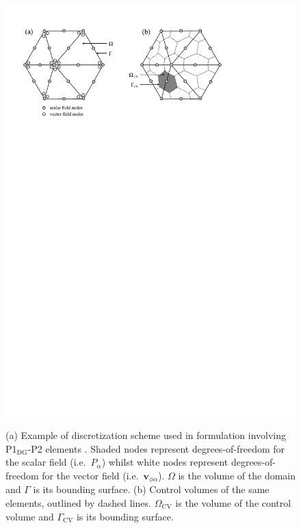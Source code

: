 \begin{figure}[h]
\vbox{
\hbox{\hspace{1cm}
  \includegraphics[width=15.0cm,height=19.cm]{./figures/discretization}}
\vspace{-14cm}}
    \caption[]{(a) Example of discretization scheme used in formulation involving P1$_\mathrm{DG}$-P2 elements \cite{cotter_2007}.  Shaded nodes represent degrees-of-freedom for the scalar field (i.e.\ $P_\alpha$) whilst white nodes represent degrees-of-freedom for the vector field (i.e.\ $\mathbf{v}_{\phi \alpha}$).  $\Omega$ is the volume of the domain and $\Gamma$ is its bounding surface.  (b) Control volumes of the same elements, outlined by dashed lines.  $\Omega_\mathrm{CV}$ is the volume of the control volume and $\Gamma_\mathrm{CV}$ is its bounding surface.\label{f:discretization}}
\end{figure}

